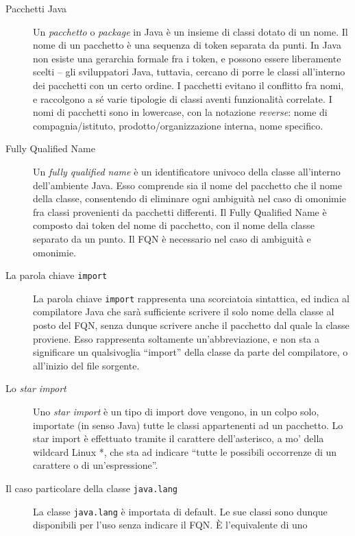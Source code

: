 \documentclass[\fontsizeclass,twocolumn]{\classname}
\theoremstyle{definition}
\theoremstyle{definition}
\begin{document}
\begin{description}
    \item[Pacchetti Java] Un \emph{pacchetto} o \emph{package} in Java è un
        insieme di classi dotato di un nome. Il nome di un pacchetto è una
        sequenza di token separata da punti. In Java non esiste una gerarchia
        formale fra i token, e possono essere liberamente scelti \--- gli
        sviluppatori Java, tuttavia, cercano di porre le classi all'interno dei
        pacchetti con un certo ordine. I pacchetti evitano il conflitto fra
        nomi, e raccolgono a sé varie tipologie di classi aventi funzionalità
        correlate. I nomi di pacchetti sono in lowercase, con la notazione
        \emph{reverse}: nome di compagnia/istituto, prodotto/organizzazione
        interna, nome specifico.
    \item[Fully Qualified Name] Un \emph{fully qualified name} è un
        identificatore univoco della classe all'interno dell'ambiente Java.
        Esso comprende sia il nome del pacchetto che il nome della classe,
        consentendo di eliminare ogni ambiguità nel caso di omonimie fra classi
        provenienti da pacchetti differenti. Il Fully Qualified Name è composto
        dai token del nome di pacchetto, con il nome della classe separato da
        un punto. Il FQN è necessario nel caso di ambiguità e omonimie.
    \item[La parola chiave \texttt{import}] La parola chiave \texttt{import}
        rappresenta una scorciatoia sintattica, ed indica al compilatore Java
        che sarà sufficiente scrivere il solo nome della classe al posto del
        FQN, senza dunque scrivere anche il pacchetto dal quale la classe
        proviene. Esso rappresenta soltamente un'abbreviazione, e non sta a
        significare un qualsivoglia ``import'' della classe da parte del
        compilatore, o all'inizio del file sorgente.
    \item[Lo \emph{star import}] Uno \emph{star import} è un tipo di import
        dove vengono, in un colpo solo, importate (in senso Java) tutte le
        classi appartenenti ad un pacchetto. Lo star import è effettuato
        tramite il carattere dell'asterisco, a mo' della wildcard Linux *, che
        sta ad indicare ``tutte le possibili occorrenze di un carattere o di un'espressione''.
    \item[Il caso particolare della classe \texttt{java.lang}] La classe
        \texttt{java.lang} è importata di default. Le sue classi sono dunque
        disponibili per l'uso senza indicare il FQN. È l'equivalente di uno

\end{description}
\end{document}

